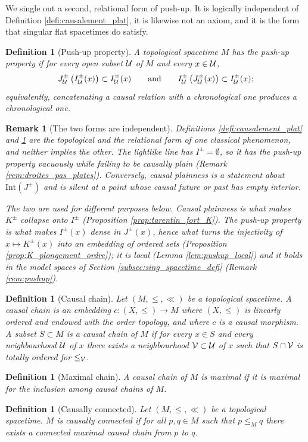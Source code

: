 \documentclass[a4paper,twoside]{article}
\newtheorem{defi}[lem]{Definition}
\newtheorem{rem}[lem]{Remark}
\begin{document}
We single out a second, relational form of push-up. It is logically independent of Definition
\ref{defi:causalement_plat}, it is likewise not an axiom, and it is the form that singular flat
spacetimes do satisfy.

\begin{defi}[Push-up property]\label{defi:pushup}
A topological spacetime $M$ has the \emph{push-up property} if for every open subset $\mathcal{U}$ of $M$ and
every $x\in \mathcal{U}$,
$$J^\pm_{\mathcal{U}}\left(I^\pm_{\mathcal{U}}(x)\right)\subset I^\pm_{\mathcal{U}}(x) \qquad\text{and}\qquad I^\pm_{\mathcal{U}}\left(J^\pm_{\mathcal{U}}(x)\right)\subset I^\pm_{\mathcal{U}}(x);$$
equivalently, concatenating a causal relation with a chronological one produces a chronological one.
\end{defi}

\begin{rem}[The two forms are independent]\label{rem:deux_pushup}
Definitions \ref{defi:causalement_plat} and \ref{defi:pushup} are the topological and the relational
form of one classical phenomenon, and neither implies the other. The lightlike line has
$I^\pm=\emptyset$, so it has the push-up property vacuously while failing to be causally plain
(Remark \ref{rem:droites_pas_plates}). Conversely, causal plainness is a statement about
$\mathrm{Int}\left(J^\pm\right)$ and is silent at a point whose causal future or past has empty
interior.

The two are used for different purposes below. Causal plainness is what makes $K^\pm$ collapse onto
$I^\pm$ (Proposition \ref{prop:tarentin_fort_K}). The push-up property is what makes $I^\pm(x)$
\emph{dense} in $J^\pm(x)$, hence what turns the injectivity of $x\mapsto K^\pm(x)$ into an embedding
of ordered sets (Proposition \ref{prop:K_plongement_ordre}); it is local (Lemma
\ref{lem:pushup_local}) and it holds in the model spaces of Section \ref{subsec:sing_spacetime_defi}
(Remark \ref{rem:pushup}).
\end{rem}
\begin{defi}[Causal chain]
Let $(M,\leq,\ll)$ be a topological spacetime.
A causal chain is an embedding $c:(X,\leq) \rightarrow M$ where $(X,\leq)$ is linearly ordered and endowed with the order topology, and where $c$ is a causal morphism.
A subset $S\subset M$ is a causal chain of $M$ if for every $x\in S$ and every neighbourhood $\mathcal{U}$ of $x$ there exists a neighbourhood $\mathcal V\subset \mathcal{U}$ of $x$ such that $S\cap \mathcal V$ is totally ordered for $\leq_\mathcal V$.
\end{defi}
\begin{defi}[Maximal chain]
A causal chain of $M$ is maximal if it is maximal for the inclusion among causal chains of $M$.
\end{defi}
\begin{defi}[Causally connected]
Let $(M,\leq,\ll)$ be a topological spacetime.
$M$ is causally connected if for all $p,q\in M$ such that $p\leq_M q$ there exists a connected maximal causal chain from $p$ to $q$.
\end{defi}
\end{document}
